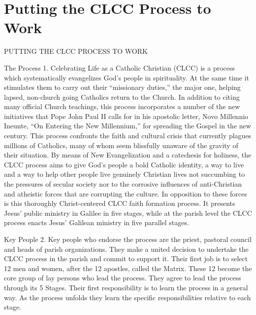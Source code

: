 \documentclass[oneside]{book}
\begin{document}
\chapter{Putting the CLCC Process to Work}

PUTTING THE CLCC PROCESS TO WORK

The Process
1. Celebrating Life as a Catholic Christian (CLCC) is a process which
systematically evangelizes God's people in spirituality. At the same time it
stimulates them to carry out their ``missionary duties,'' the major one, helping
lapsed, non-church going Catholics return to the Church. In addition to citing
many official Church teachings, this process incorporates a number of the new
initiatives that Pope John Paul II calls for in his apostolic letter, Novo
Millennio Ineunte, ``On Entering the New Millennium,'' for spreading the Gospel
in the new century.
This process confronts the faith and cultural crisis that currently plagues
millions of Catholics, many of whom seem blissfully unaware of the gravity of
their situation.
By means of New Evangelization and a catechesis for holiness, the CLCC process
aims to give God's people a bold Catholic identity, a way to live and a way to
help other people live genuinely Christian lives not succumbing to the pressures
of secular society nor to the corrosive influences of anti-Christian and
atheistic forces that are corrupting the culture. In opposition to these forces
is this thoroughly Christ-centered CLCC faith formation process. It presents
Jesus' public ministry in Galilee in five stages, while at the parish level the
CLCC process enacts Jesus' Galilean ministry in five parallel stages.

Key People
2. Key people who endorse the process are the priest, pastoral council and heads
of parish organizations. They make a united decision to undertake the CLCC
process in the parish and commit to support it.
Their first job is to select 12 men and women, after the 12 apostles, called the
Matrix. These 12 become the core group of lay persons who lead the process. They
agree to lead the process through its 5 Stages. Their first responsibility is to
learn the process in a general way. As the process unfolds they learn the
specific responsibilities relative to each stage.
\end{document}

